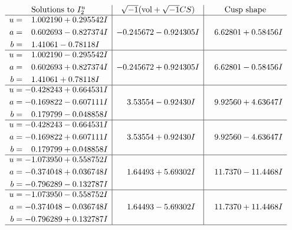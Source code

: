 \documentclass[1p]{elsarticle_modified}
\theoremstyle{definition}
\newcommand{\I}{\sqrt{-1}}
\begin{document}
$$\begin{array}{c|c|c}  
\text{Solutions to }I^u_{2}& \I (\text{vol} + \sqrt{-1}CS) & \text{Cusp shape}\\
 \hline 
\begin{aligned}
u &= \phantom{-}1.002190 + 0.295542 I \\
a &= \phantom{-}0.602693 - 0.827374 I \\
b &= \phantom{-}1.41061 - 0.78118 I\end{aligned}
 & -0.245672 - 0.924305 I & \phantom{-}6.62801 + 0.58456 I \\ \hline\begin{aligned}
u &= \phantom{-}1.002190 - 0.295542 I \\
a &= \phantom{-}0.602693 + 0.827374 I \\
b &= \phantom{-}1.41061 + 0.78118 I\end{aligned}
 & -0.245672 + 0.924305 I & \phantom{-}6.62801 - 0.58456 I \\ \hline\begin{aligned}
u &= -0.428243 + 0.664531 I \\
a &= -0.169822 - 0.607111 I \\
b &= \phantom{-}0.179799 - 0.048858 I\end{aligned}
 & \phantom{-}3.53554 - 0.92430 I & \phantom{-}9.92560 + 4.63647 I \\ \hline\begin{aligned}
u &= -0.428243 - 0.664531 I \\
a &= -0.169822 + 0.607111 I \\
b &= \phantom{-}0.179799 + 0.048858 I\end{aligned}
 & \phantom{-}3.53554 + 0.92430 I & \phantom{-}9.92560 - 4.63647 I \\ \hline\begin{aligned}
u &= -1.073950 + 0.558752 I \\
a &= -0.374048 + 0.036748 I \\
b &= -0.796289 - 0.132787 I\end{aligned}
 & \phantom{-}1.64493 + 5.69302 I & \phantom{-}11.7370 - 11.4468 I \\ \hline\begin{aligned}
u &= -1.073950 - 0.558752 I \\
a &= -0.374048 - 0.036748 I \\
b &= -0.796289 + 0.132787 I\end{aligned}
 & \phantom{-}1.64493 - 5.69302 I & \phantom{-}11.7370 + 11.4468 I\\
 \hline 
 \end{array}$$\newpage
\end{document}
